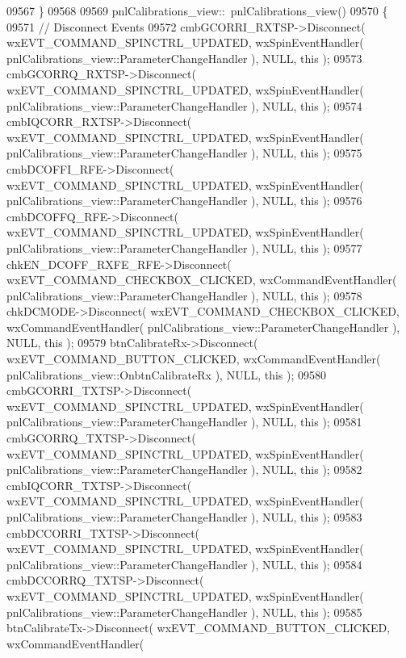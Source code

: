 \begin{DoxyCode}
09567 \}
09568 
09569 pnlCalibrations_view::~pnlCalibrations_view()
09570 \{
09571     \textcolor{comment}{// Disconnect Events}
09572     cmbGCORRI_RXTSP->Disconnect( wxEVT\_COMMAND\_SPINCTRL\_UPDATED, wxSpinEventHandler( 
      pnlCalibrations_view::ParameterChangeHandler ), NULL, \textcolor{keyword}{this} );
09573     cmbGCORRQ_RXTSP->Disconnect( wxEVT\_COMMAND\_SPINCTRL\_UPDATED, wxSpinEventHandler( 
      pnlCalibrations_view::ParameterChangeHandler ), NULL, \textcolor{keyword}{this} );
09574     cmbIQCORR_RXTSP->Disconnect( wxEVT\_COMMAND\_SPINCTRL\_UPDATED, wxSpinEventHandler( 
      pnlCalibrations_view::ParameterChangeHandler ), NULL, \textcolor{keyword}{this} );
09575     cmbDCOFFI_RFE->Disconnect( wxEVT\_COMMAND\_SPINCTRL\_UPDATED, wxSpinEventHandler( 
      pnlCalibrations_view::ParameterChangeHandler ), NULL, \textcolor{keyword}{this} );
09576     cmbDCOFFQ_RFE->Disconnect( wxEVT\_COMMAND\_SPINCTRL\_UPDATED, wxSpinEventHandler( 
      pnlCalibrations_view::ParameterChangeHandler ), NULL, \textcolor{keyword}{this} );
09577     chkEN_DCOFF_RXFE_RFE->Disconnect( wxEVT\_COMMAND\_CHECKBOX\_CLICKED, wxCommandEventHandler( 
      pnlCalibrations_view::ParameterChangeHandler ), NULL, \textcolor{keyword}{this} );
09578     chkDCMODE->Disconnect( wxEVT\_COMMAND\_CHECKBOX\_CLICKED, wxCommandEventHandler( 
      pnlCalibrations_view::ParameterChangeHandler ), NULL, \textcolor{keyword}{this} );
09579     btnCalibrateRx->Disconnect( wxEVT\_COMMAND\_BUTTON\_CLICKED, wxCommandEventHandler( 
      pnlCalibrations_view::OnbtnCalibrateRx ), NULL, \textcolor{keyword}{this} );
09580     cmbGCORRI_TXTSP->Disconnect( wxEVT\_COMMAND\_SPINCTRL\_UPDATED, wxSpinEventHandler( 
      pnlCalibrations_view::ParameterChangeHandler ), NULL, \textcolor{keyword}{this} );
09581     cmbGCORRQ_TXTSP->Disconnect( wxEVT\_COMMAND\_SPINCTRL\_UPDATED, wxSpinEventHandler( 
      pnlCalibrations_view::ParameterChangeHandler ), NULL, \textcolor{keyword}{this} );
09582     cmbIQCORR_TXTSP->Disconnect( wxEVT\_COMMAND\_SPINCTRL\_UPDATED, wxSpinEventHandler( 
      pnlCalibrations_view::ParameterChangeHandler ), NULL, \textcolor{keyword}{this} );
09583     cmbDCCORRI_TXTSP->Disconnect( wxEVT\_COMMAND\_SPINCTRL\_UPDATED, wxSpinEventHandler( 
      pnlCalibrations_view::ParameterChangeHandler ), NULL, \textcolor{keyword}{this} );
09584     cmbDCCORRQ_TXTSP->Disconnect( wxEVT\_COMMAND\_SPINCTRL\_UPDATED, wxSpinEventHandler( 
      pnlCalibrations_view::ParameterChangeHandler ), NULL, \textcolor{keyword}{this} );
09585     btnCalibrateTx->Disconnect( wxEVT\_COMMAND\_BUTTON\_CLICKED, wxCommandEventHandler( 

\end{DoxyCode}
